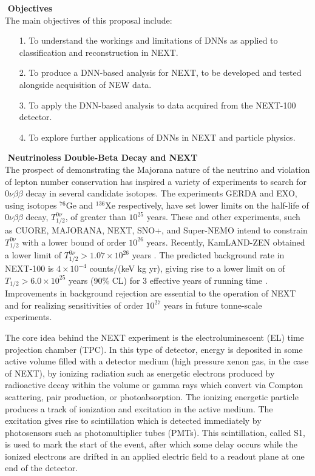 \documentclass[11pt,a4paper]{article}
\begin{document}
\noindent\textbf{\textbullet\,\,Objectives}\\
The main objectives of this proposal include:

\begin{enumerate}[itemsep=-1mm]
	\item[1.] To understand the workings and limitations of DNNs as applied to classification and reconstruction in NEXT.
	\item[2.] To produce a DNN-based analysis for NEXT, to be developed and tested alongside acquisition of NEW data.
	\item[3.] To apply the DNN-based analysis to data acquired from the NEXT-100 detector.
	\item[4.] To explore further applications of DNNs in NEXT and particle physics.
\end{enumerate}

\noindent\textbf{\textbullet\,\,Neutrinoless Double-Beta Decay and NEXT}\\
The prospect of demonstrating the Majorana nature of the neutrino and violation of lepton number conservation has inspired a variety of experiments to search for $0\nu\beta\beta$ decay in several candidate isotopes.  The experiments GERDA and EXO, using isotopes $^{76}$Ge and $^{136}$Xe respectively, have set lower limits on the half-life of $0\nu\beta\beta$ decay, $T_{1/2}^{0\nu}$, of greater than $10^{25}$ years.  These and other experiments, such as CUORE, MAJORANA, NEXT, SNO+, and Super-NEMO intend to constrain $T_{1/2}^{0\nu}$ with a lower bound of order $10^{26}$ years.  Recently, KamLAND-ZEN obtained a lower limit of $T_{1/2}^{0\nu} > 1.07\times 10^{26}$ years \cite{KamLANDZen_2016}. The predicted background rate in NEXT-100 is $4 \times 10^{-4}$ counts/(keV kg yr), giving rise to a lower limit on  of $T_{1/2} > 6.0\times 10^{25}$ years (90\% CL) for 3 effective years of running time \cite{NEXT_sensitivity}.  Improvements in background rejection are essential to the operation of NEXT and for realizing sensitivities of order $10^{27}$ years in future tonne-scale experiments.

The core idea behind the NEXT experiment is the electroluminescent (EL) time projection chamber (TPC). In this type of detector, energy is deposited in some active volume filled with a detector medium (high pressure xenon gas, in the case of NEXT), by ionizing radiation such as energetic electrons produced by radioactive decay within the volume or gamma rays which convert via Compton scattering, pair production, or photoabsorption. The ionizing energetic particle produces a track of ionization and excitation in the active medium. The excitation gives rise to scintillation which is detected immediately by photosensors such as photomultiplier tubes (PMTs). This scintillation, called S1, is used to mark the start of the event, after which some delay occurs while the ionized electrons are drifted in an applied electric field to a readout plane at one end of the detector. 
\end{document}
